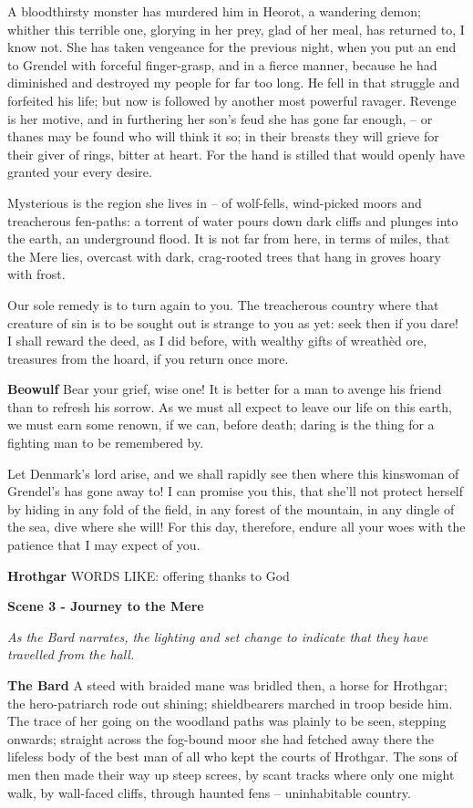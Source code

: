 \documentclass[a4paper]{article}
\begin{document}
{A bloodthirsty monster has murdered him in Heorot,
a wandering demon; whither this terrible one,
glorying in her prey, glad of her meal,
has returned to, I know not. She has taken vengeance
for the previous night, when you put an end to Grendel
with forceful finger-grasp, and in a fierce manner,
because he had diminished and destroyed my people
for far too long. He fell in that struggle
and forfeited his life; but now is followed by another
most powerful ravager. Revenge is her motive,
and in furthering her son’s feud she has gone far enough,
– or thanes may be found who will think it so;
in their breasts they will grieve for their giver of rings,
bitter at heart. For the hand is stilled
that would openly have granted your every desire.

Mysterious is the region
she lives in – of wolf-fells, wind-picked moors
and treacherous fen-paths: a torrent of water
pours down dark cliffs and plunges into the earth,
an underground flood. It is not far from here,
in terms of miles, that the Mere lies,
overcast with dark, crag-rooted trees
that hang in groves hoary with frost.

Our sole remedy
is to turn again to you. The treacherous country
where that creature of sin is to be sought out
is strange to you as yet: seek then if you dare!
I shall reward the deed, as I did before,
with wealthy gifts of wreathèd ore,
treasures from the hoard, if you return once more.

\textbf{Beowulf} Bear your grief, wise one! It is better for a man
to avenge his friend than to refresh his sorrow.
As we must all expect to leave
our life on this earth, we must earn some renown,
if we can, before death; daring is the thing
for a fighting man to be remembered by.

Let Denmark’s lord arise, and we shall rapidly see then
where this kinswoman of Grendel’s has gone away to!
I can promise you this, that she’ll not protect herself by hiding
in any fold of the field, in any forest of the mountain,
in any dingle of the sea, dive where she will!
For this day, therefore, endure all your woes
with the patience that I may expect of you.

\textbf{Hrothgar} WORDS LIKE: offering thanks to God

\centerline{\textbf{Scene 3 - Journey to the Mere}}
\centerline{\textit{As the Bard narrates, the lighting and set change to indicate that they have travelled from the hall.}}

\textbf{The Bard} A steed with braided mane was bridled then,
a horse for Hrothgar; the hero-patriarch
rode out shining; shieldbearers marched
in troop beside him. The trace of her going
on the woodland paths was plainly to be seen,
stepping onwards; straight across
the fog-bound moor she had fetched away there
the lifeless body of the best man
of all who kept the courts of Hrothgar.
The sons of men then made their way
up steep screes, by scant tracks
where only one might walk, by wall-faced cliffs,
through haunted fens – uninhabitable country.

}
\end{document}
